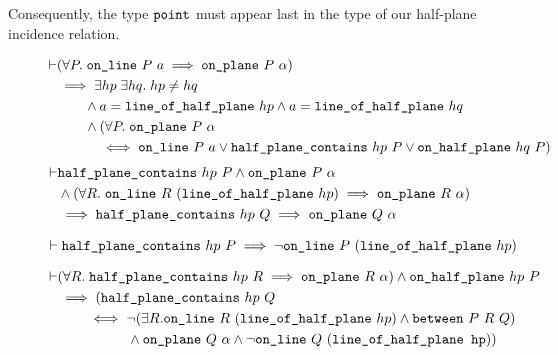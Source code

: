 Consequently, the type $\texttt{point}$ must appear last in the type of our half-plane incidence relation.
\begin{figure}
\begin{equation*}
  \begin{split}
    \vdash&(\forall P.\;\texttt{on\_line}\ P\ a \implies \texttt{on\_plane}\ P\ \alpha)\\
    &\implies \exists hp\;\exists hq.\; hp \neq hq\\
    &\qquad \wedge a = \texttt{line\_of\_half\_plane}\ hp \wedge a = \texttt{line\_of\_half\_plane}\ hq\\
    &\qquad \wedge (\forall P.\;\texttt{on\_plane}\ P\ \alpha\\
    &\qquad\quad \iff \texttt{on\_line}\ P\ a \vee \texttt{half\_plane\_contains}\ hp\ P \vee \texttt{on\_half\_plane}\ hq\ P)
  \end{split}
\end{equation*}
  \begin{equation}\label{eq:halfPlaneOnPlane}
    \begin{split}
      \vdash&\code{half\_plane\_contains}\ hp\ P \wedge \code{on\_plane}\ P\ \alpha \\
      &\wedge (\forall R.\;\code{on\_line}\ R\ (\code{line\_of\_half\_plane}\ hp) \implies \code{on\_plane}\ R\ \alpha) \\
      &\implies \code{half\_plane\_contains}\ hp\ Q \implies \code{on\_plane}\ Q\ \alpha
    \end{split}
  \end{equation}
  
  \begin{equation}\label{eq:halfPlaneNotOnLine}
    \vdash\texttt{half\_plane\_contains}\ hp\ P \implies \neg\texttt{on\_line}\ P\ (\texttt{line\_of\_half\_plane}\ hp)
  \end{equation}
  
  \begin{equation}\label{eq:onHalfPlaneNotBet}
    \begin{split}
      \vdash&(\forall R.\; \code{half\_plane\_contains}\ hp\ R \implies \code{on\_plane}\ R\ \alpha) \wedge \code{on\_half\_plane}\ hp\ P\\
      &\implies (\code{half\_plane\_contains}\ hp\ Q\\
      &\qquad \iff \neg(\exists R. \code{on\_line}\ R\ (\code{line\_of\_half\_plane}\ hp) \wedge \between{P}{R}{Q})\\
      &\qquad\qquad\quad \wedge \code{on\_plane}\ Q\ \alpha \wedge \neg\code{on\_line}\ Q\ (\code{line\_of\_half\_plane hp}))
    \end{split}
  \end{equation}
  

\end{figure}
